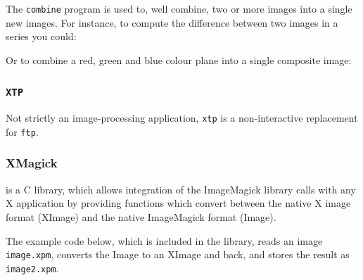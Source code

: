 \documentclass[twoside,11pt]{starlink}
\begin{document}
The \texttt{combine} program is used to, well combine, two or more images
into a single new images. For instance, to compute the difference
between two images in a series you could:

\begin{terminalv}
\end{terminalv}

Or to combine a red, green and blue colour plane into a single composite image:

\begin{terminalv}
\end{terminalv}

\subsubsection{\texttt{XTP}}

Not strictly an image-processing application, \texttt{xtp} is a
non-interactive replacement for \texttt{ftp}.

\subsubsection{XMagick}

 is a C library,
which allows integration of the ImageMagick library calls with any X
application by providing functions which convert between the native X
image format (XImage) and the native ImageMagick format (Image).

The example code below, which is included in the library, reads an
image \texttt{image.xpm}, converts the Image to an XImage and back, and
stores the result as \texttt{image2.xpm}.
\end{document}
